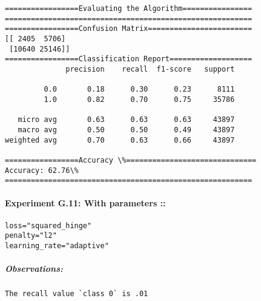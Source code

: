 \documentclass[11pt]{article}
\begin{document}
    \begin{Verbatim}[commandchars=\\\{\}]
=================Evaluating the Algorithm================
=========================================================
=================Confusion Matrix========================
[[ 2405  5706]
 [10640 25146]]
=================Classification Report===================
              precision    recall  f1-score   support

         0.0       0.18      0.30      0.23      8111
         1.0       0.82      0.70      0.75     35786

   micro avg       0.63      0.63      0.63     43897
   macro avg       0.50      0.50      0.49     43897
weighted avg       0.70      0.63      0.66     43897

=================Accuracy \%==============================
Accuracy: 62.76\%
=========================================================

    \end{Verbatim}

    \paragraph{Experiment G.11: With parameters
::}\label{experiment-g.11-with-parameters}

\begin{verbatim}
loss="squared_hinge"
penalty="l2"
learning_rate="adaptive"
\end{verbatim}

\subparagraph{Observations:}\label{observations}

\begin{verbatim}
The recall value `class 0` is .01
\end{verbatim}
\end{document}
